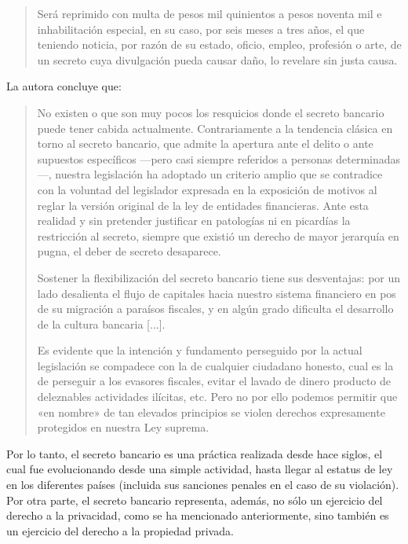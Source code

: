\documentclass[12pt,a4paper,twoside]{book}
\begin{document}
\begin{quotation}
Será reprimido con multa de pesos mil quinientos a pesos noventa mil e inhabilitación especial, en su caso, por seis meses a tres años, el que teniendo noticia, por razón de su estado, oficio, empleo, profesión o arte, de un secreto cuya divulgación pueda causar daño, lo revelare sin justa causa. \cite[Art. 156]{codigo-penal}
\end{quotation}

La autora concluye que:

\begin{quotation}
No existen o que son muy pocos los resquicios donde el secreto bancario puede tener cabida actualmente. Contrariamente a la tendencia clásica en torno al secreto bancario, que admite la apertura ante el delito o ante supuestos específicos  —pero casi siempre referidos a personas determinadas—, nuestra legislación ha adoptado un criterio amplio que se contradice con la voluntad del legislador expresada en la exposición de motivos al reglar la versión original de la ley de entidades financieras. Ante esta realidad y sin pretender justificar en patologías ni en picardías la restricción al secreto, siempre que existió un derecho de mayor jerarquía en pugna, el deber de secreto desaparece.
 
Sostener la flexibilización del secreto bancario tiene sus desventajas: por un lado desalienta el flujo de capitales hacia nuestro sistema financiero en pos de su migración a paraísos fiscales, y en algún grado dificulta el desarrollo de la cultura bancaria [...].

Es evidente que la intención y fundamento perseguido por la actual legislación se compadece con la de cualquier ciudadano honesto, cual es la de perseguir a los evasores fiscales, evitar  el lavado de dinero producto de deleznables actividades ilícitas, etc. Pero no por ello podemos permitir que «en nombre» de tan elevados principios se violen derechos expresamente protegidos en nuestra Ley suprema. \cite[pág. 14-15]{secreto-bancario}
\end{quotation}

Por lo tanto, el secreto bancario es una práctica realizada desde hace siglos, el cual fue evolucionando desde una simple actividad, hasta llegar al estatus de ley en los diferentes países (incluida sus sanciones penales en el caso de su violación). Por otra parte, el secreto bancario representa, además, no sólo un ejercicio del derecho a la privacidad, como se ha mencionado anteriormente, sino también es un ejercicio del derecho a la propiedad privada.
\end{document}
